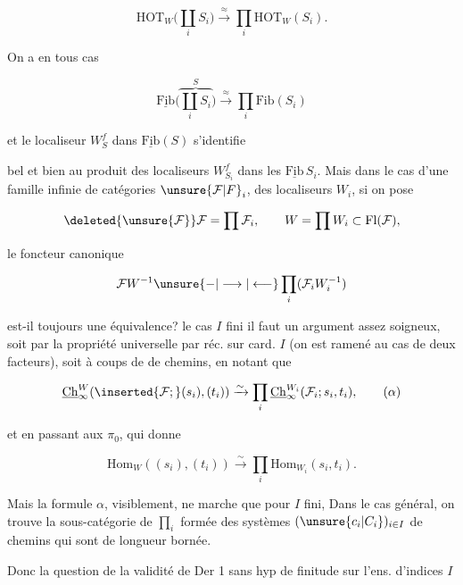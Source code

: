 
\[
\mathrm{HOT}_W\bigl(\coprod_i S_i\bigr)\xrightarrow{\approx}\prod_i\mathrm{HOT}_W(S_i).
\]

On a en tous cas

\[
\underline{\mathrm{Fib}}\bigl(\overbrace{\coprod_i S_i}^{S}\bigr)
 \xrightarrow{\approx}\prod_i\mathrm{Fib}(S_i)
\]

et le localiseur $W^f_S$  dans $\underline{\mathrm{Fib}}(S)$ s'identifie

bel et bien au produit des localiseurs $W^f_{S_i}$ dans les $\underline{\mathrm{Fib}}\,S_i$. Mais dans le cas d'une famille  infinie de catégories $\unsure{\mathcal F|F}_i$,  des localiseurs $W_i$, si on pose

\[
\deleted{\unsure{\mathcal F}}\mathcal F=\prod\mathcal F_i,\qquad W=\prod W_i\subset\mathrm{Fl}(\mathcal F),
\]

le foncteur canonique

\[
\mathcal F W^{-1}\unsure{\mathord{-}|\longrightarrow|\longleftarrow}\prod_i(\mathcal F_i W_i^{-1})
\]

est-il toujours une équivalence?  le cas $I$ fini il faut  un argument assez soigneux, soit par la propriété universelle par réc. sur card. $I$ (on est ramené au cas de deux facteurs), soit à coups de   de chemins, en notant que

\[
\underline{\mathrm{Ch}}^{W}_{\infty}(\inserted{\mathcal F;}(s_i),(t_i))
 \xrightarrow{\sim}\prod_i\underline{\mathrm{Ch}}^{W_i}_{\infty}(\mathcal F_i;s_i,t_i),
\tag*{($\alpha$)}
\]

et en passant aux $\pi_0$, qui donne

\[
\mathrm{Hom}_W((s_i),(t_i))\xrightarrow{\sim}\prod_i\mathrm{Hom}_{W_i}(s_i,t_i).
\]

Mais la formule $\alpha$, visiblement, ne marche que pour $I$ fini, Dans le cas général, on trouve la sous-catégorie  de $\prod_i$ formée des systèmes $(\unsure{c_i|C_i})_{i\in I}$ de chemins qui sont de longueur bornée.

Donc la question de la validité de Der 1 sans hyp de finitude sur l'ens. d'indices $I$

